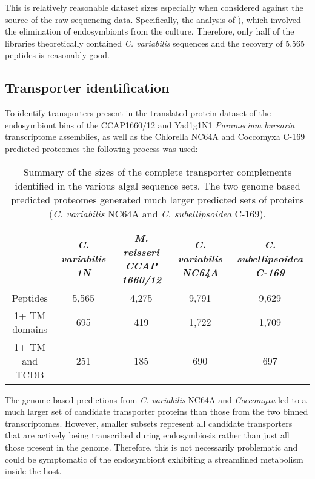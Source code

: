 This is relatively reasonable dataset sizes especially
when considered against the source of the raw sequencing data.
Specifically, the analysis of \citep{Kodama2014}), which
involved the elimination of endosymbionts from the culture.
Therefore, only half of the libraries theoretically contained
\textit{C. variabilis} sequences and the recovery of 5,565 peptides
is reasonably good.


\subsection{Transporter identification}
To identify transporters present in the translated protein dataset of the 
endosymbiont bins of the CCAP1660/12 and Yad1g1N1 
\textit{Paramecium bursaria} transcriptome assemblies, as well as the Chlorella NC64A 
and Coccomyxa C-169 predicted proteomes the following process was used:

\begin{table}
    \centering
    \begin{tabular}{|c|c|c|c|c|}
        \hline
        & \textit{C. variabilis 1N} & \textit{M. reisseri CCAP 1660/12} & \textit{C. variabilis NC64A} & \textit{C. subellipsoidea C-169} \\
        \hline
        Peptides        & 5,565 & 4,275 & 9,791 & 9,629 \\
        1+ TM domains   &   695 &   419 & 1,722 & 1,709 \\
        1+ TM and TCDB  &   251 &   185 &   690 &   697 \\
        \hline
    \end{tabular}
    \caption[Summary of Predicted Transporters Across Algal Sequences]{Summary
        of the sizes of the complete transporter complements identified in the 
        various algal sequence sets. The two genome based predicted proteomes
        generated much larger predicted sets of proteins (\textit{C. variabilis} NC64A
    and \textit{C. subellipsoidea} C-169).}
\end{table}

The genome based predictions from \textit{C. variabilis} NC64A and \textit{Coccomyxa}
led to a much larger set of candidate
transporter proteins than those from the two binned transcriptomes.
However, smaller subsets represent all 
candidate transporters
that are actively being transcribed during endosymbiosis rather than just
all those present in the genome. Therefore, this is not necessarily problematic
and could be symptomatic of the endosymbiont exhibiting a streamlined
metabolism inside the host.


